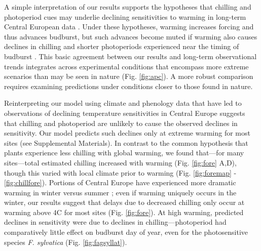\documentclass{article}
\begin{document}
\par A simple interpretation of our results supports the hypotheses that chilling and photoperiod cues may underlie declining sensitivities to warming in long-term Central European data \citep{Rutishauser:2008,yu2010,fu2015}. Under these hypotheses, warming increases forcing and thus advances budburst, but such advances become muted if warming also causes declines in chilling and shorter photoperiods experienced near the timing of budburst 
\citep{koerner2010a}.
This basic agreement between our results and long-term observational trends integrates across experimental conditions that encompass more extreme scenarios than may be seen in nature (Fig. \ref{fig:apc}). A more robust comparison requires examining predictions under conditions closer to those found in nature.


\par Reinterpreting our model using climate and phenology data that have led to observations of declining temperature sensitivities in Central Europe suggests that chilling and photoperiod are unlikely to cause the observed declines in sensitivity. Our model predicts such declines only at extreme warming for most sites (see Supplemental Materials). In contrast to the common hypothesis that plants experience less chilling with global warming, we found that---for many sites---total estimated chilling increased with warming (Fig. \ref{fig:fore} A,D), though this varied with local climate prior to warming (Fig. \ref{fig:foremap} - \ref{fig:chillfore}). 
Portions of Central Europe have experienced more dramatic warming in winter versus summer \citep{balling1998}; even if warming uniquely occurs in the winter, our results suggest that delays due to decreased chilling only occur at warming above 4\degree C for most sites (Fig. \ref{fig:fore}). At high warming, predicted declines in sensitivity were due to declines in chilling---photoperiod had comparatively little effect on budburst day of year, even for the photosensitive species \emph{F. sylvatica} (Fig. \ref{fig:fagsyllat}). 
\end{document}
